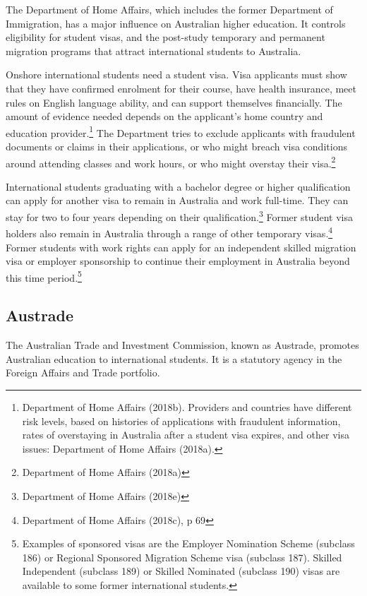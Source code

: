 \documentclass{grattan}
\begin{document}
The Department of Home Affairs, which includes the former Department of Immigration, has a major influence on Australian higher education. It controls eligibility for student visas, and the post-study temporary and permanent migration programs that attract international students to Australia.

Onshore international students need a student visa. Visa applicants must show that they have confirmed enrolment for their course, have health insurance, meet rules on English language ability, and can support themselves financially. The amount of evidence needed depends on the applicant's home country and education provider.\footnote{Department of Home Affairs (2018b). Providers and countries have different risk levels, based on histories of applications with fraudulent information, rates of overstaying in Australia after a student visa expires, and other visa issues: Department of Home Affairs (2018a).} The Department tries to exclude applicants with fraudulent documents or claims in their applications, or who might breach visa conditions around attending classes and work hours, or who might overstay their visa.\footnote{Department of Home Affairs (2018a)}

International students graduating with a bachelor degree or higher qualification can apply for another visa to remain in Australia and work full-time. They can stay for two to four years depending on their qualification.\footnote{Department of Home Affairs (2018e)} Former student visa holders also remain in Australia through a range of other temporary visas.\footnote{Department of Home Affairs (2018c), p 69} Former students with work rights can apply for an independent skilled migration visa or employer sponsorship to continue their employment in Australia beyond this time period.\footnote{Examples of sponsored visas are the Employer Nomination Scheme (subclass 186) or Regional Sponsored Migration Scheme visa (subclass 187). Skilled Independent (subclass 189) or Skilled Nominated (subclass 190) visas are available to some former international students.}

%
\subsection{Austrade}\label{subsec:austrade}

The Australian Trade and Investment Commission, known as Austrade, promotes Australian education to international students. It is a statutory agency in the Foreign Affairs and Trade portfolio.
\end{document}
